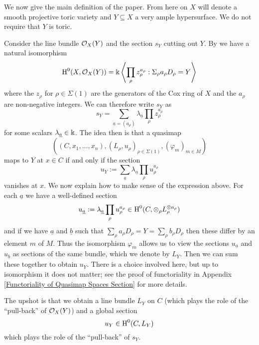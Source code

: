 We now give the main definition of the paper. From here on $X$ will denote a smooth projective toric variety and $Y \subseteq X$ a very ample hypersurface. We do not require that $Y$ is toric.

Consider the line bundle $\mathcal{O}_X(Y)$ and the section $s_Y$ cutting out $Y$. By \cite{CoxRing} we have a natural isomorphism
\begin{equation*} \operatorname{H}^0(X,\mathcal{O}_X(Y)) = \Bbbk \left\langle \prod_{\rho} z_\rho^{a_\rho} : \Sigma_\rho a_\rho D_\rho = Y \right\rangle \end{equation*}
where the $z_\rho$ for $\rho \in \Sigma(1)$ are the generators of the Cox ring of $X$ and the $a_\rho$ are non-negative integers. We can therefore write $s_Y$ as
\begin{equation*} s_Y = \sum_{\underline{a}=(a_\rho)} \lambda_{\underline{a}} \prod_\rho z_\rho^{a_\rho} \end{equation*}
for some scalars $\lambda_{\underline{a}} \in \Bbbk$. The idea then is that a quasimap
\begin{equation*} ((C,x_1,\ldots,x_n), (L_\rho,u_\rho)_{\rho \in \Sigma(1)}, (\varphi_m)_{m \in M}) \end{equation*}
maps to $Y$ at $x \in C$ if and only if the section
\begin{equation*} u_Y := \sum_{\underline{a}} \lambda_{\underline{a}} \prod_\rho u_\rho^{a_\rho} \end{equation*}
vanishes at $x$. We now explain how to make sense of the expression above. For each $\underline{a}$ we have a well-defined section
\begin{equation*} u_{\underline{a}} := \lambda_{\underline{a}} \prod_\rho u_\rho^{a_\rho} \in \operatorname{H}^0(C,\otimes_\rho L_\rho^{\otimes a_\rho}) \end{equation*}
and if we have $\underline{a}$ and $\underline{b}$ such that $\sum_\rho a_\rho D_\rho = Y = \sum_\rho b_\rho D_\rho$ then these differ by an element $m$ of $M$. Thus the isomorphism $\varphi_m$ allows us to view the sections $u_{\underline{a}}$ and $u_{\underline{b}}$ as sections of the same bundle, which we denote by $L_Y$. Then we can sum these together to obtain $u_Y$. There is a choice involved here, but up to isomorphism it does not matter; see the proof of functoriality in Appendix \ref{Functoriality of Quasimap Spaces Section} for more details.

The upshot is that we obtain a line bundle $L_Y$ on $C$ (which plays the role of the ``pull-back'' of $\mathcal{O}_X(Y)$) and a global section
\begin{equation*} u_Y \in \operatorname{H}^0(C,L_Y) \end{equation*}
which plays the role of the ``pull-back'' of $s_Y$.

